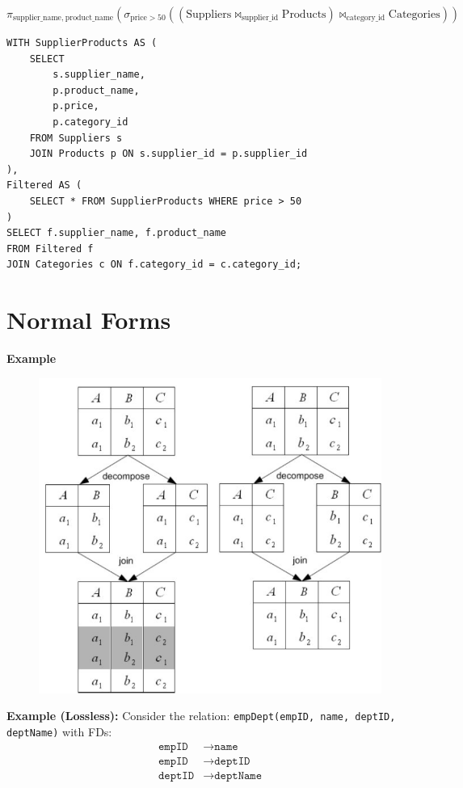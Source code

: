 \documentclass{article}
\begin{document}
\newpage
{}
\[
\pi_{\text{supplier\_name},\ \text{product\_name}} \left(
  \sigma_{\text{price} > 50} \left(
    \left(
      \text{Suppliers} \bowtie_{\text{supplier\_id}} \text{Products}
    \right)
    \bowtie_{\text{category\_id}} \text{Categories}
  \right)
\right)
\]

\begin{verbatim}
WITH SupplierProducts AS (
    SELECT 
        s.supplier_name, 
        p.product_name, 
        p.price, 
        p.category_id
    FROM Suppliers s
    JOIN Products p ON s.supplier_id = p.supplier_id
),
Filtered AS (
    SELECT * FROM SupplierProducts WHERE price > 50
)
SELECT f.supplier_name, f.product_name
FROM Filtered f
JOIN Categories c ON f.category_id = c.category_id;
\end{verbatim}

\newpage
\section{Normal Forms}

\textbf{Example}
\begin{figure}[H]
    \includegraphics[width=0.3\linewidth]{images/supurious.png}
\end{figure}


\textbf{Example (Lossless): }Consider the relation: \texttt{empDept(empID, name, deptID, deptName)} with FDs: 
\begin{align*}
\texttt{empID} &\to \texttt{name} \\
\texttt{empID} &\to \texttt{deptID} \\
\texttt{deptID} &\to \texttt{deptName}
\end{align*}
\end{document}
